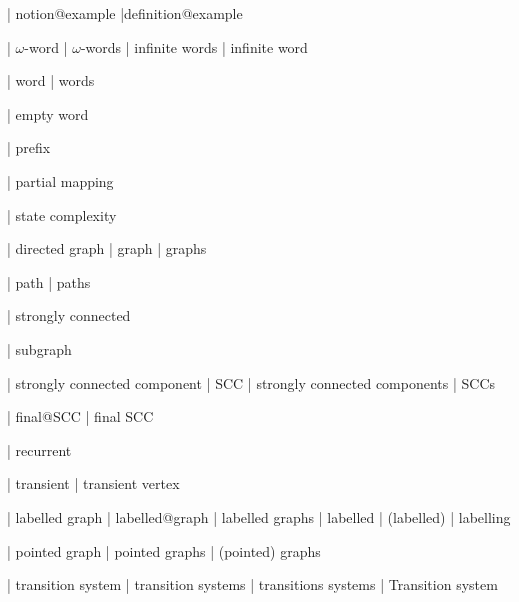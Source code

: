 



| notion@example
|definition@example

| $\omega $-word
| $\omega $-words
| infinite words
| infinite word

| word
| words

 | empty word

| prefix

  | partial mapping

  | state complexity



| directed graph
| graph
| graphs

| path
| paths

| strongly connected

| subgraph

| strongly connected component
| SCC
| strongly connected components
| SCCs


| final@SCC
| final SCC

| recurrent

| transient
| transient vertex

  | labelled graph
  | labelled@graph
  | labelled graphs
  | labelled
  | (labelled)
  | labelling
  
| pointed graph
| pointed graphs
| (pointed) graphs


 | transition system
 | transition systems
 | transitions systems
 | Transition system
 
